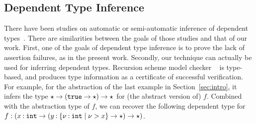 

\subsection{Dependent Type Inference}

There have been studies on automatic or semi-automatic inference of 
dependent types~\cite{Chin2001,Flanagan2006,Rondon2008,Unno2009,Jhala2009,Terauchi2010}.
There are similarities between the goals of those studies and that of 
our work. First, one of the goals of dependent type inference is to 
prove the lack of assertion failures, as in the present work. Secondly, 
our technique can actually be used for inferring dependent types. 
Recursion scheme model checker \trecs{}~\cite{Kobayashi2009c} is 
type-based, and produces type information as a certificate of successful 
verification. For example, for the abstraction of the last example in 
Section~\ref{sec:intro}, it infers the type \(\star\rightarrow (\mathtt{true} \rightarrow 
\star)\rightarrow\star\) for (the abstract version of) \(f\). Combined with 
the abstraction type of \(f\), we can recover the following dependent 
type for \(f:(x\mathbin{:} \mathtt{int} \rightarrow (y\mathbin{:}\{\nu\mathbin{:}\mathtt{int} \mid \nu>x\}\rightarrow 
\star)\rightarrow \star)\).

